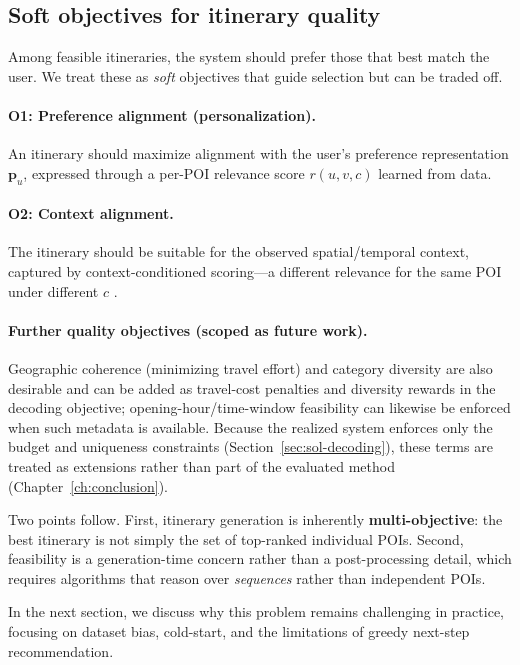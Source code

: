 \subsection{Soft objectives for itinerary quality}
Among feasible itineraries, the system should prefer those that best match the user. We treat these as \emph{soft} objectives that guide selection but can be traded off.

\paragraph{O1: Preference alignment (personalization).}
An itinerary should maximize alignment with the user's preference representation $\mathbf{p}_u$, expressed through a per-POI relevance score $r(u, v, c)$ learned from data.

\paragraph{O2: Context alignment.}
The itinerary should be suitable for the observed spatial/temporal context, captured by context-conditioned scoring---a different relevance for the same POI under different $c$ \citep{adomavicius2005tois, adomavicius2022cars}.

\paragraph{Further quality objectives (scoped as future work).}
Geographic coherence (minimizing travel effort) and category diversity are also desirable and can be added as travel-cost penalties and diversity rewards in the decoding objective; opening-hour/time-window feasibility can likewise be enforced when such metadata is available. Because the realized system enforces only the budget and uniqueness constraints (Section~\ref{sec:sol-decoding}), these terms are treated as extensions rather than part of the evaluated method (Chapter~\ref{ch:conclusion}).

Two points follow. First, itinerary generation is inherently \textbf{multi-objective}: the best itinerary is not simply the set of top-ranked individual POIs. Second, feasibility is a generation-time concern rather than a post-processing detail, which requires algorithms that reason over \emph{sequences} rather than independent POIs.

In the next section, we discuss why this problem remains challenging in practice, focusing on dataset bias, cold-start, and the limitations of greedy next-step recommendation.

